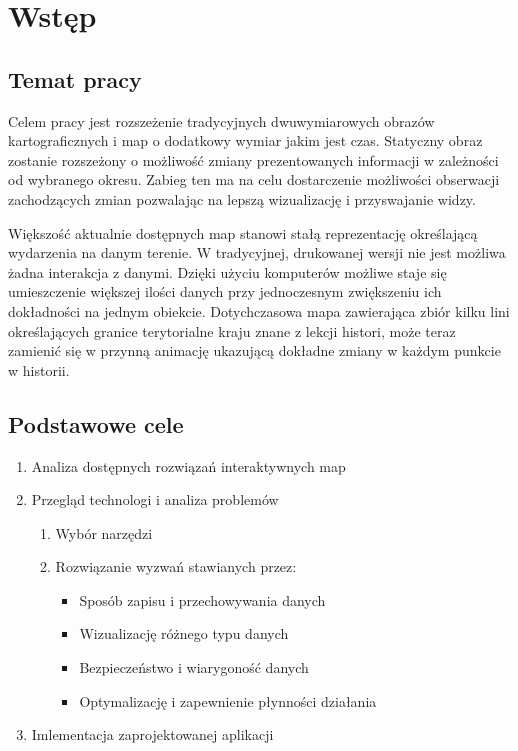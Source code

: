 \chapter{Wstęp}
\label{cha:wstep}

\nocite{gisSystems}
\nocite{webgis}
\nocite{imprxml}
\nocite{perfxml}



\section{Temat pracy}
\label{sec:tematPracy}

Celem pracy jest rozszeżenie tradycyjnych dwuwymiarowych obrazów kartograficznych i map o dodatkowy wymiar jakim jest czas.
Statyczny obraz zostanie rozszeżony o możliwość zmiany prezentowanych informacji w zależności od wybranego okresu. 
Zabieg ten ma na celu dostarczenie możliwości obserwacji zachodzących zmian pozwalając na lepszą wizualizację i 
przyswajanie widzy.

Większość aktualnie dostępnych map stanowi stałą reprezentację określającą wydarzenia na danym terenie. W tradycyjnej, 
drukowanej wersji nie jest możliwa żadna interakcja z danymi. Dzięki użyciu komputerów możliwe staje się umieszczenie 
większej ilości danych przy jednoczesnym zwiększeniu ich dokładności na jednym obiekcie. Dotychczasowa mapa zawierająca 
zbiór kilku lini określających granice terytorialne kraju znane z lekcji histori, może teraz zamienić się w przynną 
animację ukazującą dokładne zmiany w każdym punkcie w historii.



\section{Podstawowe cele}
\label{sec:geneza}

\begin{enumerate}
  \item Analiza dostępnych rozwiązań interaktywnych map
  \item Przegląd technologi i analiza problemów
  \begin{enumerate}
    \item Wybór narzędzi 
    \item Rozwiązanie wyzwań stawianych przez:
    \begin{itemize}
        \item Sposób zapisu i przechowywania danych
        \item Wizualizację różnego typu danych
        \item Bezpieczeństwo i wiarygoność danych
        \item Optymalizację i zapewnienie płynności działania
    \end{itemize}
  \end{enumerate}
  \item Imlementacja zaprojektowanej aplikacji
\end{enumerate}

